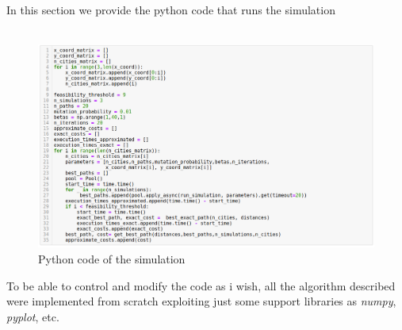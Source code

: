 \documentclass{article}
\begin{document}
\noindent In this section we provide the python code that runs the simulation\\
\\
\begin{figure}[H]
\includegraphics[scale=0.5]{simulation.png} 
\centering
\caption{Python code of the simulation}
\end{figure}

\noindent To be able to control and modify the code as i wish, all the algorithm described were implemented from scratch exploiting just some support libraries as \textit{numpy}, \textit{pyplot}, etc.
\end{document}
